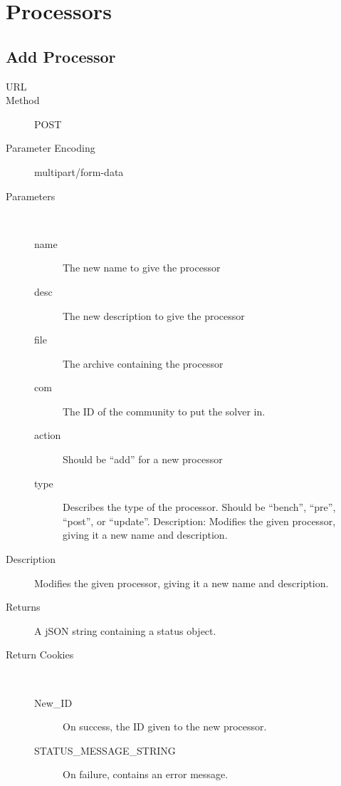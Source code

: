 \chapter{Processors}

\section{Add Processor}
\begin{description}
\item [URL] 
\item [Method] POST
\item [Parameter Encoding] multipart/form-data
\item [Parameters] \
	\begin{description}
	\item [name]  The new name to give the processor
	\item [desc] \type{String} The new description to give the processor
	\item [file] \type{File} The archive containing the processor
	\item [com]  The ID of the community to put the solver in.
	\item [action]  Should be “add” for a new processor
	\item [type] \type{String} Describes the type of the processor. Should be “bench”, “pre”, “post”, or “update”. Description: Modifies the given processor, giving it a new name and description.
	\end{description}
\item [Description] Modifies the given processor, giving it a new name and description.
\item [Returns] A jSON string containing a status object.
\item [Return Cookies] \
	\begin{description}
	\item [New\_ID]  On success, the ID given to the new processor.
	\item [STATUS\_MESSAGE\_STRING]  On failure, contains an error message.
	\end{description}
\end{description}


